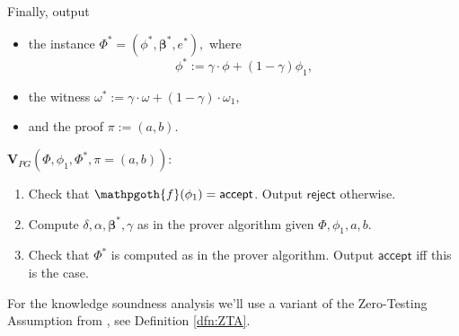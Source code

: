 \documentclass[11pt]{article} %
\newcommand{\rej}{\ensuremath{\mathsf{reject}}\xspace}
\newcommand{\acc}{\ensuremath{\mathsf{accept}}\xspace}
\newcommand{\defeq}{:=}
\newcommand{\prf}{\ensuremath{\mathsf{\pi}}\xspace}
\newcommand{\inst}{\ensuremath{\phi}\xspace}
\newcommand{\wit}{\ensuremath{\mathsf{\omega}}\xspace}
\newcommand{\ver}{\ensuremath{\mathsf{\mathbf{V}}}\xspace}
\newcommand{\verpg}{\ensuremath{\ver_{PG}}\xspace}
\newcommand{\betaa}{\ensuremath{\mathbf{\boldsymbol{\beta}}}\xspace}
\newcommand{\instt}{\ensuremath{\Phi^*}\xspace}
\newcommand{\insttbase}{\ensuremath{\Phi}\xspace}
\newcommand{\inststar}{\ensuremath{\inst^*}\xspace}
\newcommand{\witstar}{\ensuremath{\wit^*}\xspace}
\newcommand{\predinst}{\ensuremath{\mathpgoth{f}}\xspace}
\begin{document}
Finally, output
\begin{itemize}
\item the instance
$\instt=(\inststar,\betaa^*,e^*),$
where \[\inst^*\defeq \gamma\cdot \inst + (1-\gamma) \inst_1,\]


\item the witness 
$\witstar\defeq \gamma\cdot \wit + (1-\gamma)\cdot \wit_1,$
\item and the proof $\prf\defeq (a,b)$.\\
\end{itemize}
\noindent
\underline{$\verpg(\insttbase,\inst_1, \instt,\pi=(a,b)):$}\noindent
\begin{enumerate}
\item Check that $\predinst(\inst_1)=\acc$. Output \rej otherwise.
 \item Compute $\delta,\alpha,\betaa^*, \gamma$ as in the prover algorithm given $\insttbase,\inst_1,a,b$.

\item Check that $\instt$ is computed as in the prover algorithm. Output \acc iff this is the case. 
\end{enumerate}



For the knowledge soundness analysis we'll use a variant of the Zero-Testing Assumption from \cite{novarecursive}, see Definition \ref{dfn:ZTA}.
\end{document}
